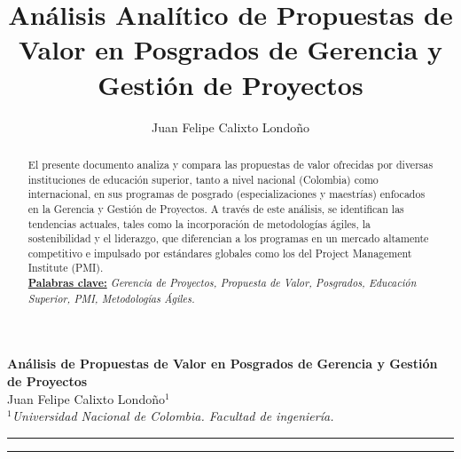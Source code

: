 \documentclass[10pt,a4paper]{article}
\author{Juan Felipe Calixto Londoño}
\title{Análisis Analítico de Propuestas de Valor en Posgrados de Gerencia y Gestión de Proyectos}
\begin{document}
	
	\begin{figure}[H]
		\raggedright
	\end{figure}

	\vspace{7.5mm}
	
	\begin{center}
		{\Large \textbf{Análisis de Propuestas de Valor en Posgrados de Gerencia y Gestión de Proyectos}}\\
		\vspace{2mm}
		{\large Juan Felipe Calixto Londoño$^{1}$}\\
		\vspace{7.5mm}
		$^1$\textit{Universidad Nacional de Colombia. Facultad de ingeniería.} \\
	\end{center}

	\begin{center}
		\textcolor{azul}{\rule{150mm}{0.5mm}}
	\end{center}		

	\begin{abstract}
		El presente documento analiza y compara las propuestas de valor ofrecidas por diversas instituciones de educación superior, tanto a nivel nacional (Colombia) como internacional, en sus programas de posgrado (especializaciones y maestrías) enfocados en la Gerencia y Gestión de Proyectos. A través de este análisis, se identifican las tendencias actuales, tales como la incorporación de metodologías ágiles, la sostenibilidad y el liderazgo, que diferencian a los programas en un mercado altamente competitivo e impulsado por estándares globales como los del Project Management Institute (PMI).
		\vspace{2mm}\\
		\underline{\textbf{Palabras clave:}} \hspace{1mm} \textit{Gerencia de Proyectos, Propuesta de Valor, Posgrados, Educación Superior, PMI, Metodologías Ágiles.}
	\end{abstract}

	\begin{center}
		\textcolor{azul}{\rule{150mm}{0.5mm}}
	\end{center}		

	\vspace{5mm}
	
\end{document}
